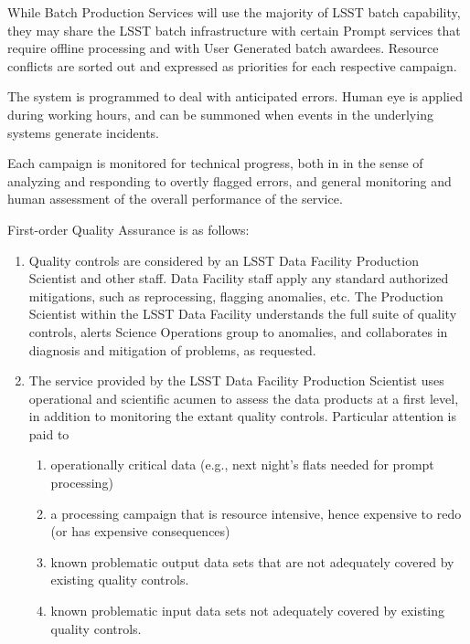 While Batch Production Services will use the majority of LSST batch capability,
they may share the LSST batch infrastructure with certain Prompt services that
require offline processing and with User Generated batch awardees. Resource conflicts
are sorted out and expressed as priorities for each respective campaign.

The system is programmed to deal with anticipated errors. Human eye is applied
during working hours, and can be summoned when events in the underlying systems
 generate incidents.

Each campaign is monitored for technical progress, both in in the sense of
analyzing and responding to overtly flagged errors, and general monitoring and
human assessment of the overall performance of the service.

First-order Quality Assurance is as follows:

\begin{enumerate}

\item Quality controls are considered by an LSST Data Facility Production
Scientist and other staff. Data Facility staff apply any standard authorized
mitigations, such as reprocessing, flagging anomalies, etc. The Production
Scientist within the LSST Data Facility understands the full suite of quality
controls, alerts Science Operations group to anomalies, and collaborates in
diagnosis and mitigation of problems, as requested.

\item The service provided by the LSST Data Facility Production Scientist uses
operational and scientific acumen to assess the data products at a first level,
in addition to monitoring the extant quality controls. Particular attention is
paid to

    \begin{enumerate}

    \item operationally critical data (e.g., next night’s flats needed for prompt
    processing)

    \item a processing campaign that is resource intensive, hence expensive to
    redo (or has expensive consequences)

    \item known problematic output data sets that are not adequately covered by
    existing quality controls.

    \item known problematic input data sets not adequately covered by existing
    quality controls.

    \end{enumerate}

\end{enumerate}

